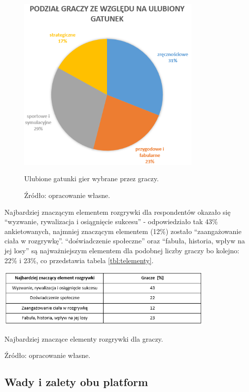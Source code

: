 \begin{figure}[htb]
  \centering
  \includegraphics[width=0.8\textwidth]{images/dgatunek.PNG}
  \caption{Ulubione gatunki gier wybrane przez graczy.}
  \caption*{Źródło: opracowanie własne.}
  \label{fig:dgatunek}
\end{figure}

\clearpage

Najbardziej znaczącym elementem rozgrywki dla respondentów okazało się ``wyzwanie, rywalizacja i osiągnięcie sukcesu'' - odpowiedziało tak 43\% ankietowanych, najmniej znaczącym elementem (12\%) zostało ``zaangażowanie ciała w rozgrywkę''. ``doświadczenie społeczne'' oraz ``fabuła, historia, wpływ na jej losy'' są najważniejszym elementem dla podobnej liczby graczy bo kolejno: 22\% i 23\%, co przedstawia tabela \ref{tbl:telementy}.

\begin{table}[htb]
  \centering
  \includegraphics[width=0.8\textwidth]{images/telementy.PNG}
  \caption{Najbardziej znaczące elementy rozgrywki dla graczy.}
  \caption*{Źródło: opracowanie własne.}
  \label{tbl:telementy}
\end{table}

\subsection{Wady i zalety obu platform}

